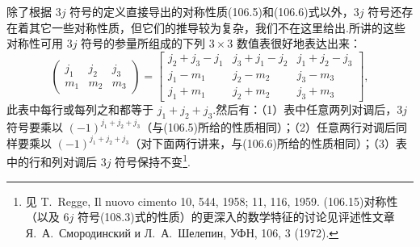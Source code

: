 除了根据 $3j$ 符号的定义直接导出的对称性质(106.5)和(106.6)式以外，$3j$ 符号还存在着其它一些对称性质，但它们的推导较为复杂，我们不在这里给出.所讲的这些对称性可用 $3j$ 符号的参量所组成的下列 $3\times3$ 数值表很好地表达出来：
\begin{equation}
  \left(\begin{array}{ccc}j_1&j_2&j_3\\m_1&m_2&m_3\end{array}\right)
  =\left[\begin{array}{ccc}
  j_2+j_3-j_1 & j_3+j_1-j_2 & j_1+j_2-j_3\\
  j_1-m_1 & j_2-m_2 & j_3-m_3\\
  j_1+m_1 & j_2+m_2 & j_3+m_3
  \end{array}\right],
\end{equation}
此表中每行或每列之和都等于 $j_1+j_2+j_3$.然后有：（1）表中任意两列对调后，$3j$ 符号要乘以 $(-1)^{j_1+j_2+j_3}$（与(106.5)所给的性质相同）；（2）任意两行对调后同样要乘以 $(-1)^{j_1+j_2+j_3}$（对下面两行讲来，与(106.6)所给的性质相同）；（3）表中的行和列对调后 $3j$ 符号保持不变\footnote{见 T.~Regge, Il nuovo cimento 10, 544, 1958; 11, 116, 1959. (106.15)对称性（以及 $6j$ 符号(108.3)式的性质）的更深入的数学特征的讨论见评述性文章 Я.~А.~Смородинский и Л.~А.~Шелепин, УФН, 106, 3 (1972).}.

